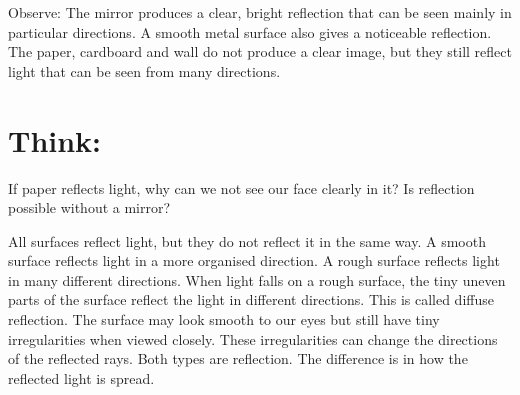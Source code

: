 \documentclass{xtufte-handout}
\begin{document}
{Observe:} The mirror produces a clear, bright reflection that can be seen mainly in particular directions. A smooth metal surface also gives a noticeable reflection. The paper, cardboard and wall do not produce a clear image, but they still reflect light that can be seen from many directions.

\section{Think:} If paper reflects light, why can we not see our face clearly in it? Is reflection possible without a mirror?

All surfaces reflect light, but they do not reflect it in the same way. A smooth surface reflects light in a more organised direction. A rough surface reflects light in many different directions. When light falls on a rough surface, the tiny uneven parts of the surface reflect the light in different directions. This is called diffuse reflection. The surface may look smooth to our eyes but still have tiny irregularities when viewed closely. These irregularities can change the directions of the reflected rays. Both types are reflection. The difference is in how the reflected light is spread.

\begin{figure}[h!]
\end{figure}

\newpage
\end{document}
